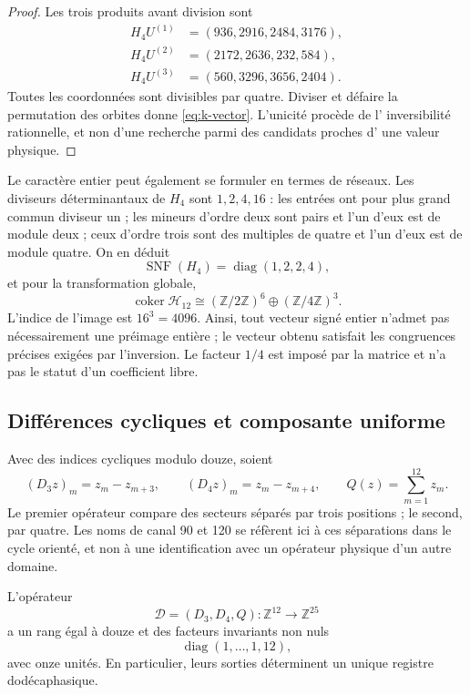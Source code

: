\begin{proof}
Les trois produits avant division sont
\begin{align*}
 H_4U^{(1)}&=(936,2916,2484,3176),\\
 H_4U^{(2)}&=(2172,2636,232,584),\\
 H_4U^{(3)}&=(560,3296,3656,2404).
\end{align*}
Toutes les coordonnées sont divisibles par quatre. Diviser et défaire la
permutation des orbites donne \eqref{eq:k-vector}. L'unicité procède de l'
inversibilité rationnelle, et non d'une recherche parmi des candidats proches d'
une valeur physique.
\end{proof}

Le caractère entier peut également se formuler en termes de réseaux. Les diviseurs déterminantaux de \(H_4\) sont \(1,2,4,16\) : les entrées ont pour plus grand commun diviseur un ; les mineurs d'ordre deux sont pairs et l'un d'eux est de module deux ; ceux d'ordre trois sont des multiples de quatre et l'un d'eux est de module quatre. On en déduit
\[
 \operatorname{SNF}(H_4)=\operatorname{diag}(1,2,2,4),
\]
et pour la transformation globale,
\[
 \operatorname{coker}\mathcal H_{12}
 \cong(\mathbb Z/2\mathbb Z)^6\oplus(\mathbb Z/4\mathbb Z)^3.
\]
L'indice de l'image est \(16^3=4096\). Ainsi, tout vecteur signé
entier n'admet pas nécessairement une préimage entière ; le vecteur obtenu satisfait les
congruences précises exigées par l'inversion. Le facteur \(1/4\) est
imposé par la matrice et n'a pas le statut d'un coefficient libre.

\subsection{Différences cycliques et composante uniforme}
\label{subsec:k-transversal}

Avec des indices cycliques modulo douze, soient
\[
 (D_3z)_m=z_m-z_{m+3},\qquad(D_4z)_m=z_m-z_{m+4},
 \qquad Q(z)=\sum_{m=1}^{12}z_m.
\]
Le premier opérateur compare des secteurs séparés par trois positions ; le
second, par quatre. Les noms de canal 90 et 120 se réfèrent ici à
ces séparations dans le cycle orienté, et non à une identification avec un
opérateur physique d'un autre domaine.

\begin{proposition}
\label{prop:k-transversal}
L'opérateur
\[
 \mathcal D=(D_3,D_4,Q):\mathbb Z^{12}\longrightarrow\mathbb Z^{25}
\]
a un rang égal à douze et des facteurs invariants non nuls
\[
 \operatorname{diag}(1,\ldots,1,12),
\]
avec onze unités. En particulier, leurs sorties déterminent un unique registre dodécaphasique.
\end{proposition}


